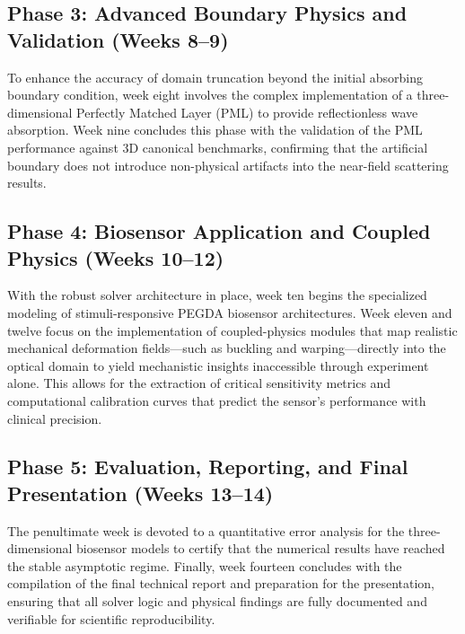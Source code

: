\documentclass[class=report, crop=false]{standalone}
\begin{document}
\subsection{Phase 3: Advanced Boundary Physics and Validation (Weeks 8--9)}

To enhance the accuracy of domain truncation beyond the initial absorbing boundary condition, week eight involves the complex implementation of a three-dimensional Perfectly Matched Layer (PML) to provide reflectionless wave absorption. Week nine concludes this phase with the validation of the PML performance against 3D canonical benchmarks, confirming that the artificial boundary does not introduce non-physical artifacts into the near-field scattering results.

\subsection{Phase 4: Biosensor Application and Coupled Physics (Weeks 10--12)}

With the robust solver architecture in place, week ten begins the specialized modeling of stimuli-responsive PEGDA biosensor architectures. Week eleven and twelve focus on the implementation of coupled-physics modules that map realistic mechanical deformation fields---such as buckling and warping---directly into the optical domain to yield mechanistic insights inaccessible through experiment alone. This allows for the extraction of critical sensitivity metrics and computational calibration curves that predict the sensor's performance with clinical precision.

\subsection{Phase 5: Evaluation, Reporting, and Final Presentation (Weeks 13--14)}

The penultimate week is devoted to a quantitative error analysis for the three-dimensional biosensor models to certify that the numerical results have reached the stable asymptotic regime. Finally, week fourteen concludes with the compilation of the final technical report and preparation for the presentation, ensuring that all solver logic and physical findings are fully documented and verifiable for scientific reproducibility.
\end{document}
